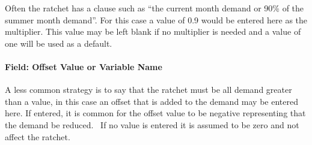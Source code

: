Often the ratchet has a clause such as ``the current month demand or 90\% of the summer month demand''. For this case a value of 0.9 would be entered here as the multiplier. This value may be left blank if no multiplier is needed and a value of one will be used as a default.

\paragraph{Field: Offset Value or Variable Name}\label{field-offset-value-or-variable-name}

A less common strategy is to say that the ratchet must be all demand greater than a value, in this case an offset that is added to the demand may be entered here. If entered, it is common for the offset value to be negative representing that the demand be reduced.~ If no value is entered it is assumed to be zero and not affect the ratchet.
